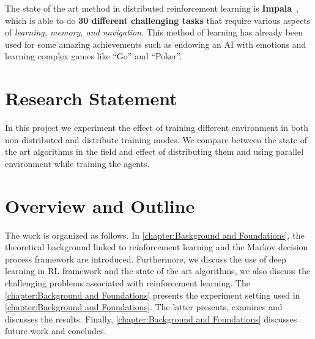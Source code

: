 The state of the art method in distributed reinforcement learning is \textbf{Impala}~\parencite{espeholt2018impala}, which is able to do \textbf{30 different challenging tasks} that require various aspects of \textit{learning, memory, and navigation}. This method of learning has already been used for some amazing achievements such as endowing an AI with emotions and learning complex games like ``Go'' and ``Poker''.


\section{Research Statement}
In this project we experiment the effect of training different environment in both non-distributed and distribute training modes. We compare between the state of the art algorithms in the field and effect of distributing them and using parallel environment while training the agents.

\section{Overview and Outline}
The work is organized as follows. In \autoref{chapter:Background and Foundations}, the theoretical background linked to reinforcement learning and the Markov decision process framework are introduced. Furthermore, we discuss the use of deep learning in RL framework and the state of the art algorithms, we also discuss the challenging problems associated with reinforcement learning.  The \autoref{chapter:Background and Foundations} presents the experiment setting used in \autoref{chapter:Background and Foundations}. The latter presents, examines and discusses the results. Finally, \autoref{chapter:Background and Foundations} discusses future work and concludes.